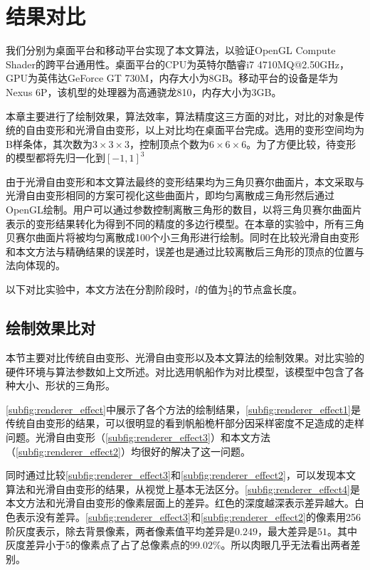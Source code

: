 \chapter{结果对比}
我们分别为桌面平台和移动平台实现了本文算法，以验证OpenGL Compute Shader的跨平台通用性。桌面平台的CPU为英特尔酷睿i7 4710MQ@2.50GHz，GPU为英伟达GeForce GT 730M，内存大小为8GB。移动平台的设备是华为Nexus 6P，该机型的处理器为高通骁龙810，内存大小为3GB。

本章主要进行了绘制效果，算法效率，算法精度这三方面的对比，对比的对象是传统的自由变形和光滑自由变形\cite{Cui15}，以上对比均在桌面平台完成。选用的变形空间均为B样条体，其次数为$3\times3\times3$，控制顶点个数为$6\times6\times6$。为了方便比较，待变形的模型都将先归一化到$[-1, 1]^3$

由于光滑自由变形和本文算法最终的变形结果均为三角贝赛尔曲面片，本文采取与光滑自由变形相同的方案可视化这些曲面片，即均匀离散成三角形然后通过OpenGL绘制。用户可以通过参数控制离散三角形的数目，以将三角贝赛尔曲面片表示的变形结果转化为得到不同的精度的多边行模型。在本章的实验中，所有三角贝赛尔曲面片将被均匀离散成100个小三角形进行绘制。同时在比较光滑自由变形和本文方法与精确结果的误差时，误差也是通过比较离散后三角形的顶点的位置与法向体现的。

以下对比实验中，本文方法在分割阶段时，$l$的值为$\frac{1}{3}$的节点盒长度。

\section{绘制效果比对}
本节主要对比传统自由变形、光滑自由变形以及本文算法的绘制效果。对比实验的硬件环境与算法参数如上文所述。对比选用帆船作为对比模型，该模型中包含了各种大小、形状的三角形。

\autoref{subfig:renderer_effect}中展示了各个方法的绘制结果，\autoref{subfig:renderer_effect1}是传统自由变形的结果，可以很明显的看到帆船桅杆部分因采样密度不足造成的走样问题。光滑自由变形（\autoref{subfig:renderer_effect3}）和本文方法（\autoref{subfig:renderer_effect2}）均很好的解决了这一问题。 

同时通过比较\autoref{subfig:renderer_effect3}和\autoref{subfig:renderer_effect2}，可以发现本文算法和光滑自由变形的结果，从视觉上基本无法区分。\autoref{subfig:renderer_effect4}是本文方法和光滑自由变形的像素层面上的差异。红色的深度越深表示差异越大。白色表示没有差异。\autoref{subfig:renderer_effect3}和\autoref{subfig:renderer_effect2}的像素用256阶灰度表示，除去背景像素，两者像素值平均差异是$0.249$，最大差异是$51$。其中灰度差异小于5的像素点了占了总像素点的$99.02\%$。所以肉眼几乎无法看出两者差别。

